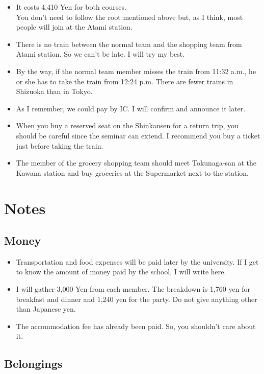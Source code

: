 \documentclass[unicode,a4paper,11pt]{ltjsarticle}
\begin{document}
\begin{itemize}
  \item
        It costs 4,410 Yen for both courses. \\
        You don't need to follow the root mentioned above but, as I think, most people will join at the Atami station. 
  \item
        There is no train between the normal team and the shopping team from Atami station. So we can't be late. I will try my best.
  \item
        By the way, if the normal team member misses the train from 11:32 a.m., he or she has to take the train from 12:24 p.m. There are fewer trains in Shizuoka than in Tokyo.
  \item
        As I remember, we could pay by IC. I will confirm and announce it later.
  \item
        When you buy a reserved seat on the Shinkansen for a return trip, you should be careful since the seminar can extend. I recommend you buy a ticket just before taking the train.
  \item
        The member of the grocery shopping team should meet Tokunaga-san at the Kawana station and buy groceries at the Supermarket next to the station.
\end{itemize}


\section{Notes}


\subsection*{Money}

\begin{itemize}
  \item
        Transportation and food expenses will be paid later by the university. If I get to know the amount of money paid by the school, I will write here.
  \item
        I will gather 3,000 Yen from each member. The breakdown is 1,760 yen for breakfast and dinner and 1,240 yen for the party. Do not give anything other than Japanese yen.
  \item
        The accommodation fee has already been paid. So, you shouldn't care about it.
\end{itemize}


\subsection*{Belongings}
\end{document}
